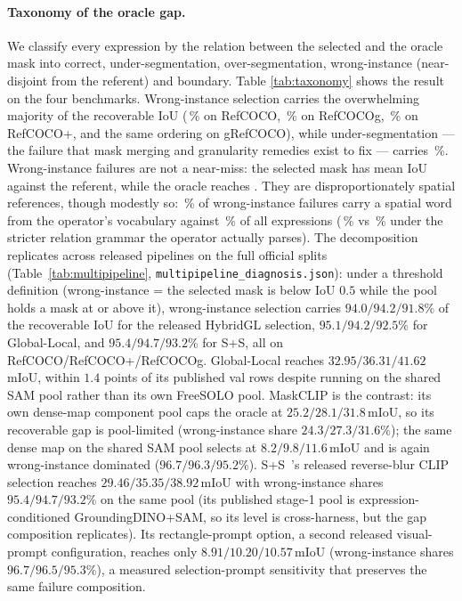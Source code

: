 \paragraph{Taxonomy of the oracle gap.}
We classify every expression by the relation between the selected and the
oracle mask into correct, under-segmentation, over-segmentation,
wrong-instance (near-disjoint from the referent) and boundary. Table
\ref{tab:taxonomy} shows the result on the four benchmarks. Wrong-instance
selection carries the overwhelming majority of the recoverable IoU
(\wiSharePct\,\% on RefCOCO, \wiShareGPct\,\% on RefCOCOg,
\wiSharePPct\,\% on RefCOCO+, and the same ordering on gRefCOCO), while
under-segmentation --- the failure that mask merging and granularity
remedies exist to fix --- carries \usSharePct\,\%. Wrong-instance failures are
not a near-miss: the selected mask has mean IoU \wrongInstIoU{} against the
referent, while the oracle reaches \oracleWhenWrong. They are
disproportionately spatial references, though modestly so:
\wiSpatialPct\,\% of wrong-instance failures carry a spatial word from the
operator's vocabulary against \spatialWordOverallPct\,\% of all expressions
(\wiParserPct\,\% vs \spatialFracPct\,\% under the stricter relation
grammar the operator actually parses). The decomposition replicates across
released pipelines on the full official splits
(Table~\ref{tab:multipipeline}, \texttt{multipipeline\_diagnosis.json}):
under a threshold definition (wrong-instance = the selected mask is below IoU
$0.5$ while the pool holds a mask at or above it), wrong-instance selection
carries $94.0/94.2/91.8\%$ of the recoverable IoU for the released HybridGL
selection, $95.1/94.2/92.5\%$ for Global-Local, and
$95.4/94.7/93.2\%$ for S+S, all on RefCOCO/RefCOCO+/RefCOCOg. Global-Local reaches $32.95/36.31/41.62$\,mIoU,
within $1.4$ points of its published val rows despite running on the shared
SAM pool rather than its own FreeSOLO pool. MaskCLIP is the contrast: its own
dense-map component pool caps the oracle at $25.2/28.1/31.8$\,mIoU, so its
recoverable gap is pool-limited (wrong-instance share
$24.3/27.3/31.6\%$); the same dense map on the shared SAM pool selects at
$8.2/9.8/11.6$\,mIoU and is again wrong-instance dominated
($96.7/96.3/95.2\%$). S+S~\cite{splus2024}'s released reverse-blur CLIP
selection reaches $29.46/35.35/38.92$\,mIoU with wrong-instance shares
$95.4/94.7/93.2\%$ on the same pool (its published stage-1 pool is
expression-conditioned GroundingDINO+SAM, so its level is cross-harness, but
the gap composition replicates). Its rectangle-prompt option, a second
released visual-prompt configuration, reaches only $8.91/10.20/10.57$\,mIoU
(wrong-instance shares $96.7/96.5/95.3\%$), a measured selection-prompt
sensitivity that preserves the same failure composition.

